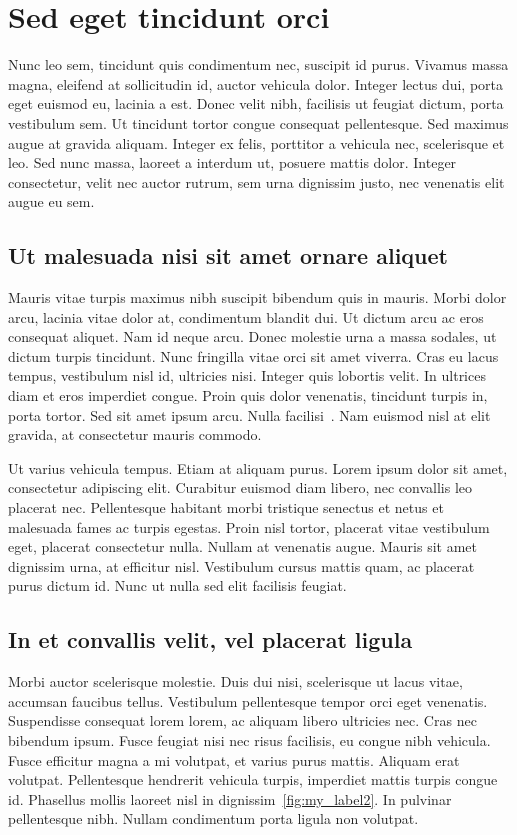 \chapter{Sed eget tincidunt orci}

Nunc leo sem, tincidunt quis condimentum nec, suscipit id purus. Vivamus massa magna, eleifend at sollicitudin id, auctor vehicula dolor. Integer lectus dui, porta eget euismod eu, lacinia a est. Donec velit nibh, facilisis ut feugiat dictum, porta vestibulum sem. Ut tincidunt tortor congue consequat pellentesque. Sed maximus augue at gravida aliquam. Integer ex felis, porttitor a vehicula nec, scelerisque et leo. Sed nunc massa, laoreet a interdum ut, posuere mattis dolor. Integer consectetur, velit nec auctor rutrum, sem urna dignissim justo, nec venenatis elit augue eu sem.
\section{Ut malesuada nisi sit amet ornare aliquet}
Mauris vitae turpis maximus nibh suscipit bibendum quis in mauris. Morbi dolor arcu, lacinia vitae dolor at, condimentum blandit dui. Ut dictum arcu ac eros consequat aliquet. Nam id neque arcu. Donec molestie urna a massa sodales, ut dictum turpis tincidunt. Nunc fringilla vitae orci sit amet viverra. Cras eu lacus tempus, vestibulum nisl id, ultricies nisi. Integer quis lobortis velit. In ultrices diam et eros imperdiet congue. Proin quis dolor venenatis, tincidunt turpis in, porta tortor. Sed sit amet ipsum arcu. Nulla facilisi~\cite{Bocharnkinov_Ukraine}. Nam euismod nisl at elit gravida, at consectetur mauris commodo.

Ut varius vehicula tempus. Etiam at aliquam purus. Lorem ipsum dolor sit amet, consectetur adipiscing elit. Curabitur euismod diam libero, nec convallis leo placerat nec. Pellentesque habitant morbi tristique senectus et netus et malesuada fames ac turpis egestas. Proin nisl tortor, placerat vitae vestibulum eget, placerat consectetur nulla. Nullam at venenatis augue. Mauris sit amet dignissim urna, at efficitur nisl. Vestibulum cursus mattis quam, ac placerat purus dictum id. Nunc ut nulla sed elit facilisis feugiat.
\section{In et convallis velit, vel placerat ligula}
Morbi auctor scelerisque molestie. Duis dui nisi, scelerisque ut lacus vitae, accumsan faucibus tellus. Vestibulum pellentesque tempor orci eget venenatis. Suspendisse consequat lorem lorem, ac aliquam libero ultricies nec. Cras nec bibendum ipsum. Fusce feugiat nisi nec risus facilisis, eu congue nibh vehicula. Fusce efficitur magna a mi volutpat, et varius purus mattis. Aliquam erat volutpat. Pellentesque hendrerit vehicula turpis, imperdiet mattis turpis congue id. Phasellus mollis laoreet nisl in dignissim~\ref{fig:my_label2}. In pulvinar pellentesque nibh. Nullam condimentum porta ligula non volutpat.


